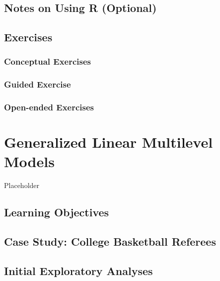\documentclass[
]{krantz}
\begin{document}
\hypertarget{notesr9}{%
\section{Notes on Using R (Optional)}\label{notesr9}}

\hypertarget{exercises-8}{%
\section{Exercises}\label{exercises-8}}

\hypertarget{conceptual-exercises-6}{%
\subsection{Conceptual Exercises}\label{conceptual-exercises-6}}

\hypertarget{guided-exercise-2}{%
\subsection{Guided Exercise}\label{guided-exercise-2}}

\hypertarget{open-ended-exercises-4}{%
\subsection{Open-ended Exercises}\label{open-ended-exercises-4}}

\hypertarget{ch-GLMM}{%
\chapter{Generalized Linear Multilevel Models}\label{ch-GLMM}}

Placeholder

\hypertarget{objectives}{%
\section{Learning Objectives}\label{objectives}}

\hypertarget{cs:refs}{%
\section{Case Study: College Basketball Referees}\label{cs:refs}}

\hypertarget{explore-glmm}{%
\section{Initial Exploratory Analyses}\label{explore-glmm}}
\end{document}
